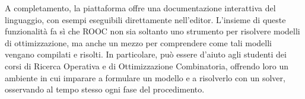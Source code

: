 A completamento, la piattaforma offre una documentazione interattiva del
linguaggio, con esempi eseguibili direttamente nell'editor. L'insieme di queste
funzionalità fa sì che ROOC non sia soltanto uno strumento per risolvere modelli
di ottimizzazione, ma anche un mezzo per comprendere come tali modelli vengano
compilati e risolti. In particolare, può essere d'aiuto agli studenti dei corsi
di Ricerca Operativa e di Ottimizzazione Combinatoria, offrendo loro un ambiente
in cui imparare a formulare un modello e a risolverlo con un solver, osservando
al tempo stesso ogni fase del procedimento.
